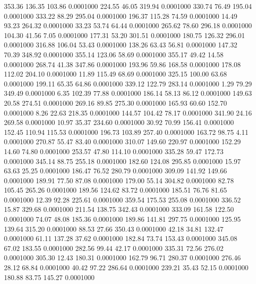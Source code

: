  353.36  136.35  103.86   0.0001000
 224.55   46.05  319.94   0.0001000
 330.74   76.49  195.04   0.0001000
 333.22   88.29  295.04   0.0001000
 196.37  115.28   74.59   0.0001000
  14.49   93.23  264.32   0.0001000
  33.23   53.74   64.44   0.0001000
 265.62   78.60  296.18   0.0001000
 104.30   41.56    7.05   0.0001000
 177.31   53.20  301.51   0.0001000
 180.75  126.32  296.01   0.0001000
 316.88  106.04   53.43   0.0001000
 138.26   63.43   56.81   0.0001000
 147.32   70.39  348.92   0.0001000
 355.14  123.06   58.69   0.0001000
 355.17   49.42   14.58   0.0001000
 268.74   41.38  347.86   0.0001000
 193.96   59.86  168.58   0.0001000
 178.08  112.02  204.10   0.0001000
  11.89  115.49   68.69   0.0001000
 325.15  100.00   63.68   0.0001000
 199.11   65.35   64.86   0.0001000
 339.12  122.79  283.14   0.0001000
   1.29   79.29  349.49   0.0001000
   6.35  102.39   77.88   0.0001000
 186.14   58.13   86.12   0.0001000
 149.63   20.58  274.51   0.0001000
 269.16   89.85  275.30   0.0001000
 165.93   60.60  152.70   0.0001000
   8.26   22.63  218.35   0.0001000
 144.57  104.42   78.17   0.0001000
 341.90   24.16  269.58   0.0001000
  10.97   35.37  234.60   0.0001000
  30.92   70.99  156.41   0.0001000
 152.45  110.94  115.53   0.0001000
 196.73  103.89  257.40   0.0001000
 163.72   98.75    4.11   0.0001000
 270.87   55.47   83.40   0.0001000
 310.07  149.60  220.97   0.0001000
 152.29   14.60   74.80   0.0001000
 253.57   47.80  114.10   0.0001000
 335.28   59.47  172.73   0.0001000
 345.14   88.75  255.18   0.0001000
 182.60  124.08  295.85   0.0001000
  15.97   63.63   25.25   0.0001000
 186.47   76.52  280.79   0.0001000
 309.09  141.92  149.66   0.0001000
 189.91   77.50   87.08   0.0001000
 179.00   55.14  304.82   0.0001000
  82.78  105.45  265.26   0.0001000
 189.56  124.62   83.72   0.0001000
 185.51   76.76   81.65   0.0001000
  12.39   92.28  225.61   0.0001000
 359.54  175.53  255.08   0.0001000
 336.52   15.87  329.68   0.0001000
 211.54  138.75  342.43   0.0001000
 333.09  161.58  122.50   0.0001000
  74.07   48.08  185.36   0.0001000
 189.86  141.81  297.75   0.0001000
 125.95  139.64  315.20   0.0001000
  88.53   27.66  350.43   0.0001000
  42.18   34.81  132.47   0.0001000
  61.11  137.28   37.62   0.0001000
 182.84   73.74  153.43   0.0001000
 345.08   67.02  183.55   0.0001000
 282.56   99.44   42.17   0.0001000
 335.31   72.56  276.02   0.0001000
 305.30   12.43  180.31   0.0001000
 162.79   96.71  280.37   0.0001000
 276.46   28.12   68.84   0.0001000
  40.42   97.22  286.64   0.0001000
 239.21   35.43   52.15   0.0001000
 180.88   83.75  145.27   0.0001000
